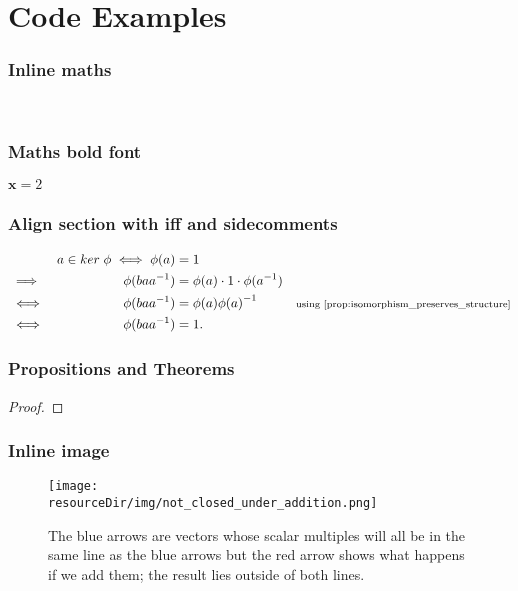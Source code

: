 \documentclass[MathsNotesBase.tex]{subfiles}
\date{\vspace{-6ex}}
\begin{document}
	\chapter*{Code Examples}
	
	\subsection{Inline maths}
	${}$ %
	${\bm{}}$ %
	
	\subsection{Maths bold font}
	$\bm{x} = 2$
	
	\subsection{Align section with iff and sidecomments}
	\[\begin{aligned}
		&& a \in ker \; \phi \iff \phi(a) &= 1 \\
		&\implies & \phi(ba\inv{a}) &= \phi(a) \cdot 1 \cdot \phi(\inv{a}) \\
		&\iff & \phi(ba\inv{a}) &= \phi(a)\inv{\phi(a)} &\sidecomment{using \autoref{prop:isomorphism_preserves_structure}} \\
		&\iff & \phi(ba\inv{a}) &= 1.
	\end{aligned}\]

	\subsection{Propositions and Theorems}
	\begin{proof}
	\end{proof}
	
	\subsection{Inline image}
	\begin{figure}[h!]
		\texttt{[image: \\resourceDir/img/not\_closed\_under\_addition.png]}
		\caption{The blue arrows are vectors whose scalar multiples will all be in the same line as the blue arrows but the red arrow shows what happens if we add them; the result lies outside of both lines.}
		\label{fig:label-must-go-here}
	\end{figure}
	
\end{document}
